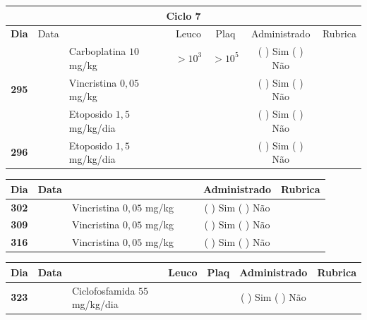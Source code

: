 \documentclass[11pt,a4paper,oldfontcommands]{memoir}
\begin{document}
\begin{center}
\begin{table}[H] \small
\begin{tabular}{p{1cm}c|p{4.8cm}|p{1.8cm}p{1.8cm}|c|c}
	\hline
	\multicolumn{7}{c}{Ciclo 7} \\
	\hline
	\multicolumn{1}{c|}{\multirow{1}{*}{\textbf{Dia}}}&{Data}&{}&\multicolumn{1}{c|}{Leuco}&\multicolumn{1}{c|}{Plaq}&{Administrado}&{Rubrica} \\
    \hline
    \multicolumn{1}{c|}{\multirow{3}{*}{\textbf{295}}}&\multirow{2}{*}{}&{Carboplatina \(10\) mg/kg}&\multicolumn{1}{c|}{\(>10^3\)}&\multicolumn{1}{c|}{\(>10^5\)}&{(  ) Sim (  ) Não}&\\
    \cline{4-5}
    \multicolumn{1}{c|}{}&&{Vincristina \(0,05\) mg/kg}&\multicolumn{1}{c|}{}&&{(  ) Sim (  ) Não}&\\
    \cline{4-5}
    \multicolumn{1}{c|}{}&\multirow{1}{*}{}&{Etoposido \(1,5\) mg/kg/dia}&{}&&{(  ) Sim (  ) Não}&\\
    \cline{1-3}\cline{6-6}
    \multicolumn{1}{c|}{\textbf{296}}&\multirow{1}{*}{}&{Etoposido \(1,5\) mg/kg/dia}&{}&&{(  ) Sim (  ) Não}&\\
    \hline
\end{tabular}
\end{table}
\begin{table}[H] \small
\begin{tabular}{p{1cm}c|p{4.8cm}|p{1.8cm}p{1.8cm}|c|c}
	\hline
	\multicolumn{1}{c|}{\multirow{1}{*}{\textbf{Dia}}}&{Data}&{}&{}&&{Administrado}&{Rubrica} \\
    \hline
    \multicolumn{1}{c|}{\textbf{302}}&&{Vincristina \(0,05\) mg/kg}&\multicolumn{1}{c}{}&&{(  ) Sim (  ) Não}&\\
    \hline
    \multicolumn{1}{c|}{\textbf{309}}&&{Vincristina \(0,05\) mg/kg}&\multicolumn{1}{c}{}&&{(  ) Sim (  ) Não}&\\
    \hline
    \multicolumn{1}{c|}{\textbf{316}}&&{Vincristina \(0,05\) mg/kg}&\multicolumn{1}{c}{}&&{(  ) Sim (  ) Não}&\\
    \hline
\end{tabular}
\end{table}
\begin{table}[H] \small
\begin{tabular}{p{1cm}c|p{4.8cm}|p{1.8cm}p{1.8cm}|c|c}
	\hline
	\multicolumn{1}{c|}{\multirow{1}{*}{\textbf{Dia}}}&{Data}&{}&\multicolumn{1}{c|}{Leuco}&\multicolumn{1}{c|}{Plaq}&{Administrado}&{Rubrica} \\
    \hline
    \multicolumn{1}{c|}{\multirow{3}{*}{\textbf{323}}}&&{Ciclofosfamida \(55\) mg/kg/dia}&\multicolumn{1}{c|}{}&&{(  ) Sim (  ) Não}&\\

\end{tabular}
\end{table}
\end{center}
\end{document}
